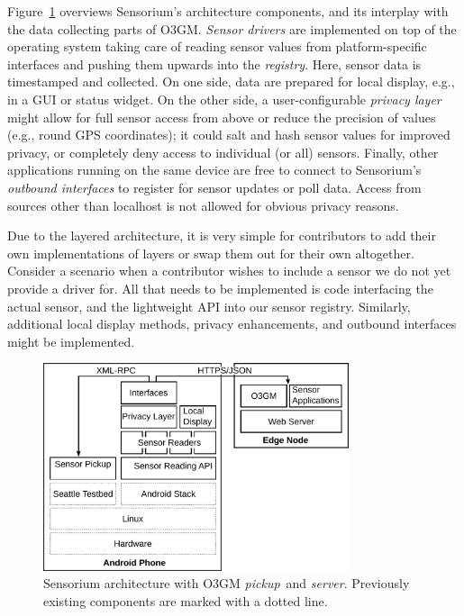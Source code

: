 
Figure~\ref{c5:fig:architecture} overviews Sensorium's architecture components, and its interplay with the data collecting parts of \gls{O3GM}. \textit{Sensor drivers} are implemented on top of the operating system taking care of reading sensor values from platform-specific interfaces and pushing them upwards into the \textit{registry}. Here, sensor data is timestamped and collected. On one side, data are prepared for local display, e.g., in a \gls{GUI} or status widget. On the other side, a user-configurable \textit{privacy layer} might allow for full sensor access from above or reduce the precision of values (e.g., round \gls{GPS} coordinates); it could salt and hash sensor values for improved privacy, or completely deny access to individual (or all) sensors. Finally, other applications running on the same device are free to connect to Sensorium's \textit{outbound interfaces} to register for sensor updates or poll data. Access from sources other than localhost is not allowed for obvious privacy reasons.

Due to the layered architecture, it is very simple for contributors to add their own implementations of layers or swap them out for their own altogether. Consider a scenario when a contributor wishes to include a sensor we do not yet provide a driver for. All that needs to be implemented is code interfacing the actual sensor, and the lightweight \gls{API} into our sensor registry. Similarly, additional local display methods, privacy enhancements, and outbound interfaces might be implemented.

\begin{figure}[htb]
	\centering
	\includegraphics[width=0.8\textwidth]{images/sensorium-arch.pdf}
	\caption{Sensorium architecture with \gls{O3GM} \textit{pickup}~and \textit{server}. Previously existing components are marked with a dotted line.}
\label{c5:fig:architecture}
\end{figure}

